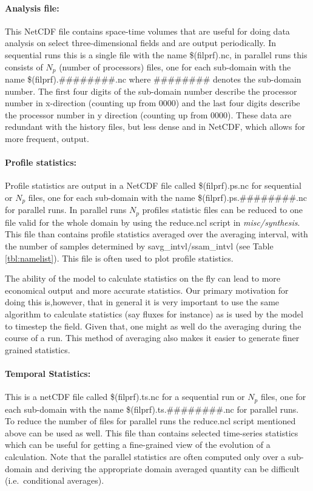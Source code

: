 \documentclass[11pt,a4paper]{article}
\begin{document}
\paragraph{Analysis file:}  This NetCDF file contains space-time
volumes that are useful for doing data analysis on select 
three-dimensional fields and are output periodically.
In sequential runs this is a single file with the name \$(filprf).nc,
in parallel runs this consists of $N_p$ (number of processors) files,
one for each sub-domain with the name \$(filprf).\#\#\#\#\#\#\#\#.nc
where \#\#\#\#\#\#\#\# denotes the sub-domain number. The first four
digits of the sub-domain number describe the processor number in
x-direction (counting up from 0000) and the last four digits describe
the processor number in y direction (counting up from 0000).
These data are redundant with the history files, but less dense and
in NetCDF, which allows for more frequent, output.

\paragraph{Profile statistics:}  Profile statistics are output in a
NetCDF file called \$(filprf).ps.nc for sequential or $N_p$ files,
one for each sub-domain with the name \$(filprf).ps.\#\#\#\#\#\#\#\#.nc
for parallel runs. In parallel runs $N_p$ profiles statistic files
can be reduced to one file valid for the whole domain by using the
reduce.ncl script in \emph{misc/synthesis}. This file than contains
profile statistics averaged over the averaging interval,
with the number of samples determined by savg\_intvl/ssam\_intvl
(see Table \ref{tbl:namelist}). This file is often used to plot
profile statistics.

The ability of the model to calculate statistics on the fly can
lead to more economical output and more accurate statistics.
Our primary motivation for doing this is,however, that in
general it is very important to use the same algorithm
to calculate statistics (say fluxes for instance) as is used by the
model to timestep the field. Given that, one might as well do the
averaging during the course of a run. This method of averaging also
makes it easier to generate finer grained statistics.

\paragraph{Temporal Statistics:}  This is a netCDF file called
\$(filprf).ts.nc for a sequential run or $N_p$ files,
one for each sub-domain with the name \$(filprf).ts.\#\#\#\#\#\#\#\#.nc
for parallel runs. To reduce the number of files for parallel runs
the reduce.ncl script mentioned above can be used as well.
This file than contains selected time-series statistics
which can be useful for getting a fine-grained view of the evolution of a
calculation. Note that the parallel statistics are often computed
only over a sub-domain and deriving the appropriate domain averaged
quantity can be difficult (i.e.\ conditional averages).
\end{document}

